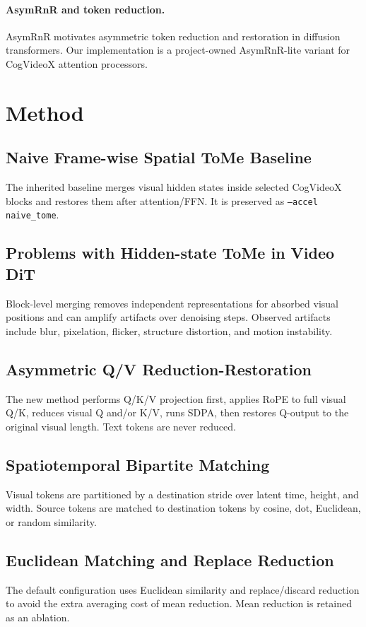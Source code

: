 \documentclass{article}
\begin{document}
\paragraph{AsymRnR and token reduction.}
AsymRnR motivates asymmetric token reduction and restoration in diffusion transformers.
Our implementation is a project-owned AsymRnR-lite variant for CogVideoX attention processors.

\section{Method}
\subsection{Naive Frame-wise Spatial ToMe Baseline}
The inherited baseline merges visual hidden states inside selected CogVideoX blocks and restores them after attention/FFN.
It is preserved as \texttt{--accel naive\_tome}.

\subsection{Problems with Hidden-state ToMe in Video DiT}
Block-level merging removes independent representations for absorbed visual positions and can amplify artifacts over denoising steps.
Observed artifacts include blur, pixelation, flicker, structure distortion, and motion instability.

\subsection{Asymmetric Q/V Reduction-Restoration}
The new method performs Q/K/V projection first, applies RoPE to full visual Q/K, reduces visual Q and/or K/V, runs SDPA, then restores Q-output to the original visual length.
Text tokens are never reduced.

\subsection{Spatiotemporal Bipartite Matching}
Visual tokens are partitioned by a destination stride over latent time, height, and width.
Source tokens are matched to destination tokens by cosine, dot, Euclidean, or random similarity.

\subsection{Euclidean Matching and Replace Reduction}
The default configuration uses Euclidean similarity and replace/discard reduction to avoid the extra averaging cost of mean reduction.
Mean reduction is retained as an ablation.
\end{document}
